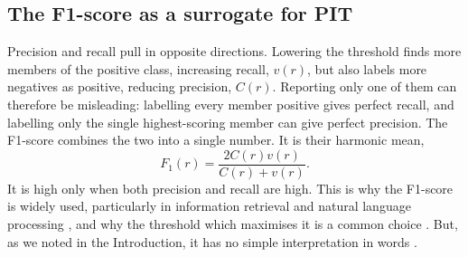 \documentclass[preprint,12pt]{article}
\begin{document}
\subsection*{The F1-score as a surrogate for PIT}

\label{sec:others}

Precision and recall pull in opposite directions. Lowering the threshold finds more members of the positive class, increasing recall, $v(r)$, but also labels more negatives as positive, reducing precision, $C(r)$. Reporting only one of them can therefore be misleading: labelling every member positive gives perfect recall, and labelling only the single highest-scoring member can give perfect precision. The F1-score combines the two into a single number. It is their harmonic mean,
\begin{equation}
F_1(r) =  \frac{2 C(r) v(r)}{C(r) + v(r)} .  \label{eq:F1}
\end{equation}
It is high only when both precision and recall are high. This is why the F1-score is widely used, particularly in information retrieval and natural language processing \cite{chinchor1993muc, manning2008introduction, sasaki2007truth}, and why the threshold which maximises it is a common choice \cite{lipton2014optimal}. But, as we noted in the Introduction, it has no simple interpretation in words \cite{hand2018note}.
\end{document}
